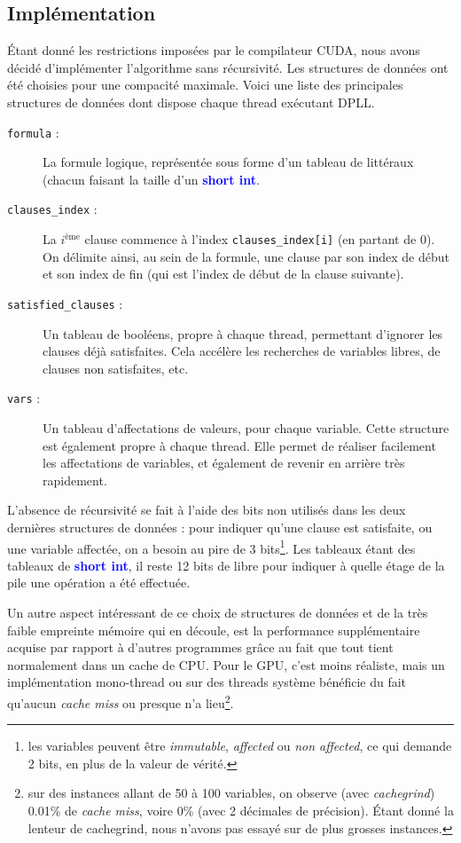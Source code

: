 \documentclass{article}
\newcommand{\keyword}[1]{\textbf{\textcolor{blue}{#1}}}
\newcommand{\code}[1]{\texttt{{#1}}}
\newcommand{\cuda}{\textsc{CUDA}}
\begin{document}
\subsection{Implémentation}
Étant donné les restrictions imposées par le compilateur \cuda, nous avons décidé d'implémenter l'algorithme sans récursivité. Les structures de données ont été choisies pour une compacité maximale. Voici une liste des principales structures de données dont dispose chaque thread exécutant \textsc{DPLL}.
\begin{description}
    \item[\code{formula} :] La formule logique, représentée sous forme d'un tableau de littéraux (chacun faisant la taille d'un \keyword{short int}.
    \item[\code{clauses\_index} :] La $i^{\textrm{ème}}$ clause commence à l'index \code{clauses\_index[i]} (en partant de 0). On délimite ainsi, au sein de la formule, une clause par son index de début et son index de fin (qui est l'index de début de la clause suivante).
    \item[\code{satisfied\_clauses} :] Un tableau de booléens, propre à chaque thread, permettant d'ignorer les clauses déjà satisfaites. Cela accélère les recherches de variables libres, de clauses non satisfaites, etc.
    \item[\code{vars} :] Un tableau d'affectations de valeurs, pour chaque variable. Cette structure est également propre à chaque thread. Elle permet de réaliser facilement les affectations de variables, et également de revenir en arrière très rapidement.
\end{description}

L'absence de récursivité se fait à l'aide des bits non utilisés dans les deux dernières structures de données : pour indiquer qu'une clause est satisfaite, ou une variable affectée, on a besoin au pire de 3 bits\footnote{les variables peuvent être \emph{immutable}, \emph{affected} ou \emph{non affected}, ce qui demande 2 bits, en plus de la valeur de vérité.}. Les tableaux étant des tableaux de \keyword{short int}, il reste 12 bits de libre pour indiquer à quelle étage de la pile une opération a été effectuée.

Un autre aspect intéressant de ce choix de structures de données et de la très faible empreinte mémoire qui en découle, est la performance supplémentaire acquise par rapport à d'autres programmes grâce au fait que tout tient normalement dans un cache de CPU. Pour le GPU, c'est moins réaliste, mais un implémentation mono-thread ou sur des threads système bénéficie du fait qu'aucun \emph{cache miss} ou presque n'a lieu\footnote{sur des instances allant de 50 à 100 variables, on observe (avec \emph{cachegrind}) 0.01\% de \emph{cache miss}, voire 0\% (avec 2 décimales de précision). Étant donné la lenteur de cachegrind, nous n'avons pas essayé sur de plus grosses instances.}.
\end{document}
